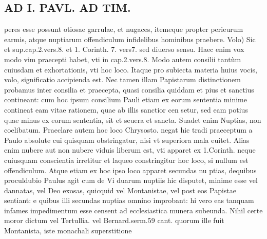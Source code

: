 \documentclass{article}
\begin{document}
\begin{pages}
\section*{AD I. PAVL. AD TIM. }
\marginpar{[ p.Ayo ]}\pstart peres esse possunt otiosae garrulae, et nugaces, itemeque propter perieurum earmis, atque nuptiarum offendiculum infidelibus hominibus praebere.  \pend\pstart Volo) Sic et sup.cap.2.vers.8. et 1. Corinth. 7. vers7. sed diuerso sensu. Haec enim vox modo vim praecepti habet, vti in cap.2.vers.8. Modo autem consilii tantùm cuiusdam et exhortationis, vti hoc loco. Itaque pro subiecta materia huius vocis, volo, significatio accipienda est. Nec tamen illam Papistarum distinctionem probamus inter consilia et praecepta, quasi consilia quiddam et pius et sanctius contineant: cum hoc ipsum consilium Pauli etiam ex eorum sententia minime contineat eam vitae rationem, quae ab illis sanctior cen setur, sed eam potius quae minus ex eorum sententia, sit et seuera et sancta. Suadet enim Nuptias, non coelibatum. Praeclare autem hoc loco Chrysosto. negat hic tradi praeceptum a Paulo absolute cui quisquam obstringatur, nisi vt superiora mala euitet. Alias enim nubere aut non nubere viduis liberum est, vti apparet ex 1.Corinth. neque  cuiusquam conscientia irretitur et laqueo constringitur hoc loco, si nullum est offendiculum. Atque etiam ex hoc ipso loco apparet secundas nu ptias, dequibus proculdubio Paulus agit cum de Vi duarum nuptiis hic disputet, minime esse vel dannatas, vel Deo exosas, quicquid vel Montanistae, vel post eos Papistae sentiant: e quibus illi secundas nuptias omnino improbant: hi vero eas tanquam infames impedimentum esse censent ad ecclesiastica munera subeunda. Nihil certe moror dictum vel Tertullia. vel Bernard.serm.59 cant. quorum ille fuit Montanista, iste monachali superstitione  \pend

\end{pages}
\end{document}
